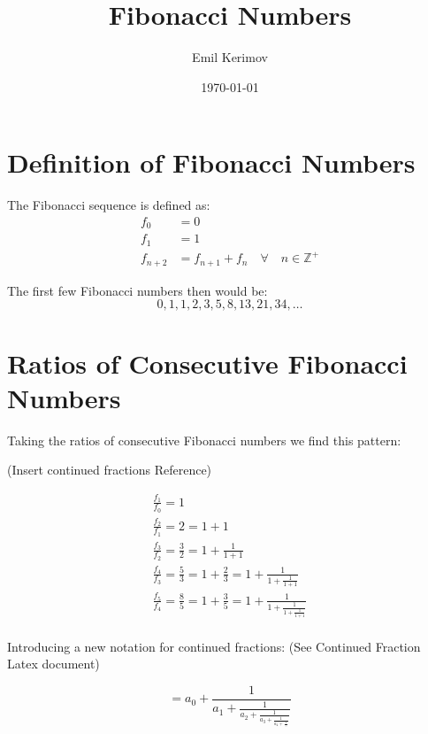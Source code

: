 \documentclass[a4paper]{article}
\title{Fibonacci Numbers}
\author{Emil Kerimov}
\date{\today}
\begin{document}
\maketitle



\section{Definition of Fibonacci Numbers}\label{fib:sec:definition}

The Fibonacci sequence is defined as:
\begin{equation}
\begin{aligned}
f_0 &= 0 \\
f_1 &= 1 \\
f_{n+2} &= f_{n+1} + f_{n} \quad \forall \quad n \in \mathbb{Z}^+
\end{aligned}\label{fib:eq:equation2}
\end{equation}

The first few Fibonacci numbers then would be:
\[
0,1,1,2,3,5,8,13,21, 34, \dots
\]

\section{Ratios of Consecutive Fibonacci Numbers}\label{fib:sec:basic_ratio}

Taking the ratios of consecutive Fibonacci numbers we find this pattern:

(Insert continued fractions Reference)

\begin{gather*}
\frac{f_{1}}{f_{0}} =1 \\
\frac{f_{2}}{f_{1}} =2 = 1 + 1\\
\frac{f_{3}}{f_{2}} = \frac{3}{2} = 1 + \frac{1}{1+1}\\
\frac{f_{4}}{f_{3}} = \frac{5}{3} = 1 + \frac{2}{3}= 1 + \frac{1}{1 + \frac{1}{1 + 1}}\\
\frac{f_{5}}{f_{4}} = \frac{8}{5} = 1 + \frac{3}{5}= 1 + \frac{1}{1 + \frac{1}{1 + \frac{1}{1 + 1}}}\\
\end{gather*}

Introducing a new notation for continued fractions: (See Continued Fraction Latex document)

\begin{equation}
[a_0;a_1,a_2,a_3,a_4, ...] =  a_0 + \frac{1}{a_1 + \frac{1}{a_2 + \frac{1}{a_3 +  \frac{1}{a_4 + \frac{1}{...}}}}}\label{fib:eq:equation}
\end{equation}
\end{document}
